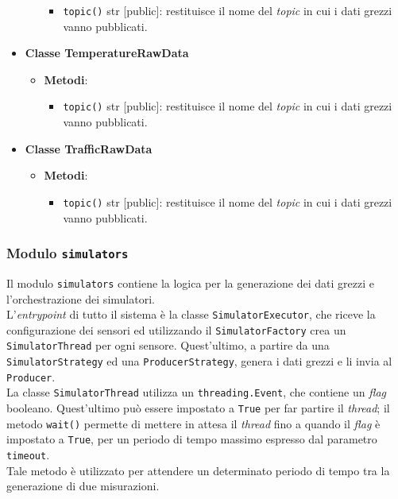 \begin{itemize}
\begin{itemize}
\begin{itemize}
			            \item \texttt{topic()} str [public]: restituisce il nome del \textit{topic} in cui i dati grezzi vanno pubblicati.
		            \end{itemize}
	      \end{itemize}
	\item \textbf{Classe TemperatureRawData}
	      \begin{itemize}
		      \item \textbf{Metodi}:
		            \begin{itemize}
			            \item \texttt{topic()} str [public]: restituisce il nome del \textit{topic} in cui i dati grezzi vanno pubblicati.
		            \end{itemize}
	      \end{itemize}
	\item \textbf{Classe TrafficRawData}
	      \begin{itemize}
		      \item \textbf{Metodi}:
		            \begin{itemize}
			            \item \texttt{topic()} str [public]: restituisce il nome del \textit{topic} in cui i dati grezzi vanno pubblicati.
		            \end{itemize}
	      \end{itemize}
\end{itemize}

\subsubsection{Modulo \texttt{simulators}}
Il modulo \texttt{simulators} contiene la logica per la generazione dei dati grezzi e l'orchestrazione dei simulatori.\\
L'\textit{entrypoint} di tutto il sistema è la classe \texttt{SimulatorExecutor}, che riceve la configurazione dei sensori
ed utilizzando il \texttt{SimulatorFactory} crea un \texttt{SimulatorThread} per ogni sensore.
Quest'ultimo, a partire da una \texttt{SimulatorStrategy} ed una \texttt{ProducerStrategy}, genera i dati grezzi e li invia al \texttt{Producer}.\\
La classe \texttt{SimulatorThread} utilizza un \texttt{threading.Event}, che contiene un \textit{flag} booleano.
Quest'ultimo può essere impostato a \texttt{True} per far partire il \textit{thread}; il metodo \texttt{wait()} permette di mettere in attesa il \textit{thread} fino a quando il \textit{flag} è
impostato a \texttt{True}, per un periodo di tempo massimo espresso dal parametro \texttt{timeout}.\\ Tale metodo è utilizzato per attendere un determinato periodo di tempo tra la generazione di due misurazioni.\\

